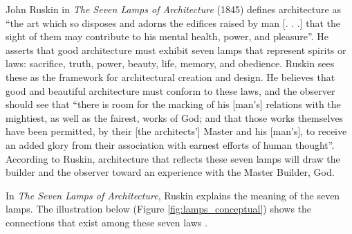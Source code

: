 John Ruskin in \textit{The Seven Lamps of Architecture} (1845) defines
architecture as ``the art which so disposes and adorns the edifices
raised by man [. . .] that the sight of them may contribute to his
mental health, power, and pleasure''\citep[][p.~8]{ruskin1920}.  He asserts that
good architecture must exhibit seven lamps that represent spirits or
laws: sacrifice, truth, power, beauty, life, memory, and obedience. 
Ruskin sees these as the framework for architectural creation and
design.  He believes that good and beautiful architecture must conform
to these laws, and the observer should see that ``there is room for the
marking of his [man’s] relations with the mightiest, as well as the
fairest, works of God; and that those works themselves have been
permitted, by their [the architects’] Master and his [man’s], to
receive an added glory from their association with earnest efforts of
human thought''\citep[][p.~73]{ruskin1920}.  According to Ruskin, architecture that reflects
these seven lamps will draw the builder and the observer toward an
experience with the Master Builder, God.  

In \textit{The Seven Lamps of Architecture}, Ruskin explains the
meaning of the seven lamps.  The illustration below (Figure \ref{fig:lamps_conceptual}) shows the
connections that exist among these seven laws \citep[][p.~402]{baljon1997}.


